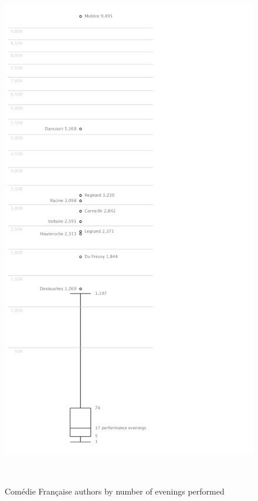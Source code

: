 \documentclass[	DIV=calc,%
							paper=a4,%
							fontsize=11pt,%
							twocolumn]{scrartcl}	 					%
\begin{document}
\begin{figure}
  \centering
  \includegraphics[height=9in]{viz/author_performances.pdf}
	\caption{Comédie Française authors by number of evenings performed}
  \label{fig:tukey_boxplot}
\end{figure}
\end{document}

